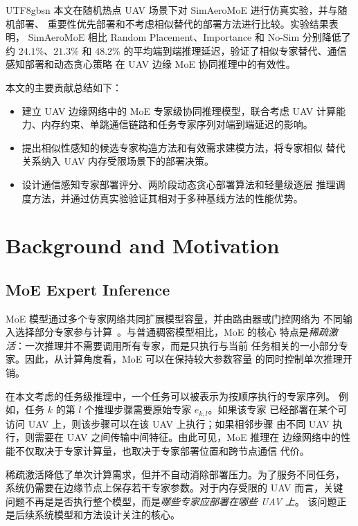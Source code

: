 \documentclass[conference]{IEEEtran}
\begin{document}
\begin{CJK*}{UTF8}{gbsn}
本文在随机热点 UAV 场景下对 SimAeroMoE 进行仿真实验，并与随机部署、
重要性优先部署和不考虑相似替代的部署方法进行比较。实验结果表明，
SimAeroMoE 相比 Random Placement、Importance 和
No-Sim 分别降低了约 $24.1\%$、$21.3\%$ 和 $48.2\%$
的平均端到端推理延迟，验证了相似专家替代、通信感知部署和动态贪心策略
在 UAV 边缘 MoE 协同推理中的有效性。

本文的主要贡献总结如下：
\begin{itemize}
  \item 建立 UAV 边缘网络中的 MoE 专家级协同推理模型，联合考虑 UAV
    计算能力、内存约束、单跳通信链路和任务专家序列对端到端延迟的影响。
  \item 提出相似性感知的候选专家构造方法和有效需求建模方法，将专家相似
    替代关系纳入 UAV 内存受限场景下的部署决策。
  \item 设计通信感知专家部署评分、两阶段动态贪心部署算法和轻量级逐层
    推理调度方法，并通过仿真实验验证其相对于多种基线方法的性能优势。
\end{itemize}

\section{Background and Motivation}
\label{sec:background}

\subsection{MoE Expert Inference}
\label{sec:bg_moe}

MoE 模型通过多个专家网络共同扩展模型容量，并由路由器或门控网络为
不同输入选择部分专家参与计算~\cite{shazeer2017moe,fedus2022switch,
lepikhin2021gshard,jiang2024mixtral}。与普通稠密模型相比，MoE 的核心
特点是\emph{稀疏激活}：一次推理并不需要调用所有专家，而是只执行与当前
任务相关的一小部分专家。因此，从计算角度看，MoE 可以在保持较大参数容量
的同时控制单次推理开销。

在本文考虑的任务级推理中，一个任务可以被表示为按顺序执行的专家序列。
例如，任务 $k$ 的第 $l$ 个推理步骤需要原始专家 $e_{k,l}$。如果该专家
已经部署在某个可访问 UAV 上，则该步骤可以在该 UAV 上执行；如果相邻步骤
由不同 UAV 执行，则需要在 UAV 之间传输中间特征。由此可见，MoE 推理在
边缘网络中的性能不仅取决于专家计算量，也取决于专家部署位置和跨节点通信
代价。

稀疏激活降低了单次计算需求，但并不自动消除部署压力。为了服务不同任务，
系统仍需要在边缘节点上保存若干专家参数。对于内存受限的 UAV 而言，关键
问题不再是是否执行整个模型，而是\emph{哪些专家应部署在哪些 UAV 上}。
该问题正是后续系统模型和方法设计关注的核心。


\end{CJK*}
\end{document}
